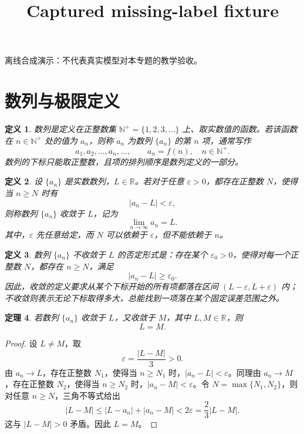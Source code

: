 \documentclass[UTF8,fontset=fandol,11pt]{ctexart}
\title{Captured missing-label fixture}
\date{}
\newtheorem{definition}{定义}[section]
\newtheorem{theorem}[definition]{定理}
\begin{document}
\maketitle
\par\noindent 离线合成演示：不代表真实模型对本专题的教学验收。\par
\section{数列与极限定义}\label{sec:S01}
\begin{definition}
\label{def:sequence}数列是定义在正整数集 $\mathbb{N}^{+}=\{1,2,3,\ldots\}$ 上、取实数值的函数。若该函数在 $n\in\mathbb{N}^{+}$ 处的值为 $a_n$，则称 $a_n$ 为数列 $\{a_n\}$ 的第 $n$ 项，通常写作
\[
a_1,a_2,\ldots,a_n,\ldots,
\qquad a_n=f(n),\quad n\in\mathbb{N}^{+}.
\]
数列的下标只能取正整数，且项的排列顺序是数列定义的一部分。
\end{definition}
\begin{definition}
\label{def:sequence-limit}\label{def:epsilon-N}设 $\{a_n\}$ 是实数数列，$L\in\mathbb{R}$。若对于任意 $\varepsilon>0$，都存在正整数 $N$，使得当 $n\geq N$ 时有
\[
|a_n-L|<\varepsilon,
\]
则称数列 $\{a_n\}$ 收敛于 $L$，记为
\[
\lim_{n\to\infty}a_n=L.
\]
其中，$\varepsilon$ 先任意给定，而 $N$ 可以依赖于 $\varepsilon$，但不能依赖于 $n$。
\end{definition}
\begin{definition}
数列 $\{a_n\}$ 不收敛于 $L$ 的否定形式是：存在某个 $\varepsilon_0>0$，使得对每一个正整数 $N$，都存在 $n\geq N$，满足
\[
|a_n-L|\geq\varepsilon_0.
\]
因此，收敛的定义要求从某个下标开始的所有项都落在区间 $(L-\varepsilon,L+\varepsilon)$ 内；不收敛则表示无论下标取得多大，总能找到一项落在某个固定误差范围之外。
\end{definition}
\begin{theorem}
\label{thm:limit-unique}若数列 $\{a_n\}$ 收敛于 $L$，又收敛于 $M$，其中 $L,M\in\mathbb{R}$，则
\[
L=M.
\]
\end{theorem}
\begin{proof}
设 $L\ne M$，取
\[
\varepsilon=\frac{|L-M|}{3}>0.
\]
由 $a_n\to L$，存在正整数 $N_1$，使得当 $n\geq N_1$ 时，$|a_n-L|<\varepsilon$。同理由 $a_n\to M$，存在正整数 $N_2$，使得当 $n\geq N_2$ 时，$|a_n-M|<\varepsilon$。令 $N=\max\{N_1,N_2\}$，则对任意 $n\geq N$，三角不等式给出
\[
|L-M|\leq |L-a_n|+|a_n-M|<2\varepsilon=\frac{2}{3}|L-M|.
\]
这与 $|L-M|>0$ 矛盾。因此 $L=M$。
\end{proof}
\end{document}

